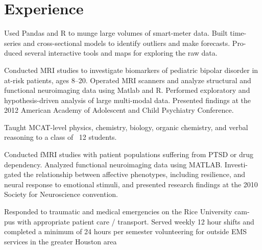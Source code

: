 \documentclass[]{deedy-resume-openfont}
\begin{document}
\begin{minipage}[t]{0.66\textwidth} 


\section{Experience}

\vspace{\topsep} %
Used Pandas and R to munge large volumes of smart-meter data. Built time- series and cross-sectional models to identify outliers and make forecasts. Pro- duced several interactive tools and maps for exploring the raw data.
\sectionsep

\vspace{\topsep} %
Conducted MRI studies to investigate biomarkers of pediatric bipolar disorder in at-risk patients, ages 8–20. Operated MRI scanners and analyze structural and functional neuroimaging data using Matlab and R. Performed exploratory and hypothesis-driven analysis of large multi-modal data. Presented findings at the 2012 American Academy of Adolescent and Child Psychiatry Conference.
\sectionsep

\vspace{\topsep} %
Taught MCAT-level physics, chemistry, biology, organic chemistry, and verbal reasoning to a class of ~12 students.
\sectionsep

\vspace{\topsep} %
Conducted fMRI studies with patient populations suffering from PTSD or drug dependency. Analyzed functional neuroimaging data using MATLAB. Investi- gated the relationship between affective phenotypes, including resilience, and neural response to emotional stimuli, and presented research findings at the 2010 Society for Neuroscience convention.
\sectionsep

\vspace{\topsep} %
Responded to traumatic and medical emergencies on the Rice University cam- pus with appropriate patient care / transport. Served weekly 12 hour shifts and completed a minimum of 24 hours per semester volunteering for outside EMS services in the greater Houston area
\sectionsep

\end{minipage} 
\end{document}
